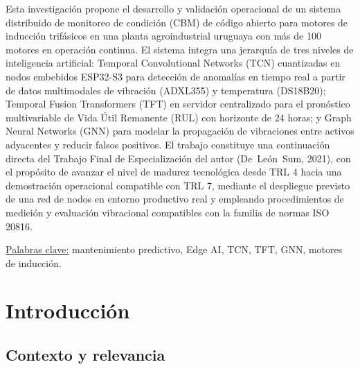 \documentclass[11pt]{article}
\begin{document}
\noindent Esta investigación propone el desarrollo y validación operacional de un sistema distribuido de monitoreo de condición (CBM) de código abierto para motores de inducción trifásicos en una planta agroindustrial uruguaya con más de 100 motores en operación continua. El sistema integra una jerarquía de tres niveles de inteligencia artificial: Temporal Convolutional Networks (TCN) cuantizadas en nodos embebidos ESP32-S3 para detección de anomalías en tiempo real a partir de datos multimodales de vibración (ADXL355) y temperatura (DS18B20); Temporal Fusion Transformers (TFT) en servidor centralizado para el pronóstico multivariable de Vida Útil Remanente (RUL) con horizonte de 24 horas; y Graph Neural Networks (GNN) para modelar la propagación de vibraciones entre activos adyacentes y reducir falsos positivos. El trabajo constituye una continuación directa del Trabajo Final de Especialización del autor (De~León~Sum, 2021), con el propósito de avanzar el nivel de madurez tecnológica desde TRL 4 hacia una demostración operacional compatible con TRL 7, mediante el despliegue previsto de una red de nodos en entorno productivo real y empleando procedimientos de medición y evaluación vibracional compatibles con la familia de normas ISO 20816.

\vspace{0.3cm}
\noindent \underline{Palabras clave:} mantenimiento predictivo, Edge AI, TCN, TFT, GNN, motores de inducción.

\newpage

\listoffigures
{}
\newpage
\thispagestyle{empty}

\tableofcontents
\newpage
{}

\section{Introducción}
\label{sec:introduccion}


\subsection{Contexto y relevancia}
\end{document}
